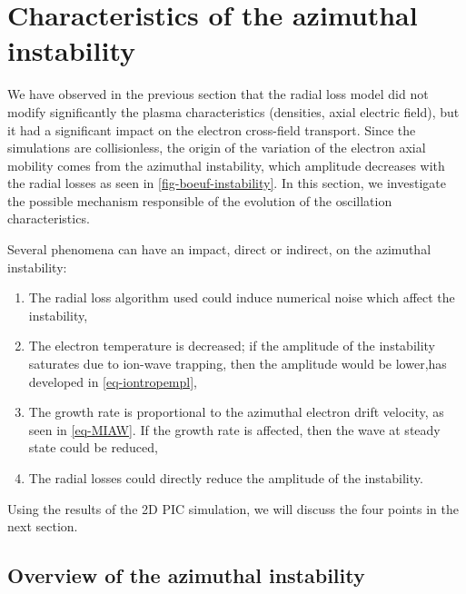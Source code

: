

\section{Characteristics of the azimuthal instability}
  \label{sec-Ztheta-instability}

  We have observed in the previous section that the radial loss model did not modify significantly the plasma characteristics (densities, axial electric field), but it had a significant impact on the electron cross-field transport.
  Since the simulations are collisionless, the origin of the variation of the electron axial mobility comes from the azimuthal instability, which amplitude decreases with the radial losses as seen in \cref{fig-boeuf-instability}.
  In this section, we investigate the possible mechanism responsible of the evolution of the oscillation characteristics.

  Several phenomena can have an impact, direct or indirect, on the azimuthal instability\string:
  \begin{enumerate}
    \item The radial loss algorithm used could induce numerical noise which affect the instability,
    \item The electron temperature is decreased\string; if the amplitude of the instability saturates due to ion-wave trapping, then the amplitude would be lower,has developed in \cref{eq-iontropempl},
    \item The growth rate is proportional to the azimuthal electron drift velocity, as seen in \cref{eq-MIAW}. If the growth rate is affected, then the wave at steady state could be reduced,
    \item The radial losses  could directly reduce the amplitude of the instability.
  \end{enumerate}

  Using the results of the \ac{2D} \ac{PIC} simulation, we will discuss the four points in the next section.
  



\subsection{Overview of the azimuthal instability} \label{subsec-azi_insta_Ztheta}
  
